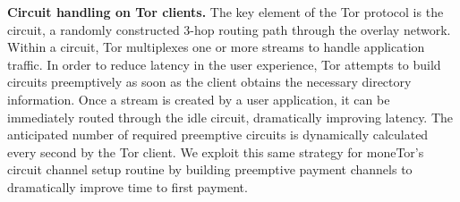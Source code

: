 \medskip
\noindent
\textbf{Circuit handling on Tor clients.}
%
The key element of the Tor protocol is the circuit, a randomly
constructed 3-hop routing path through the overlay network. Within a circuit,
Tor multiplexes one or more streams to handle application traffic. In order to
reduce latency in the user experience, Tor attempts to build circuits
preemptively as soon as the client obtains the necessary directory information.
Once a stream is created by a user application, it can be immediately routed
through the idle circuit, dramatically improving latency. The anticipated number
of required preemptive circuits is dynamically calculated every second by the
Tor client. We exploit this same strategy for moneTor's circuit channel setup
routine by building preemptive payment channels to dramatically improve time to
first payment.




